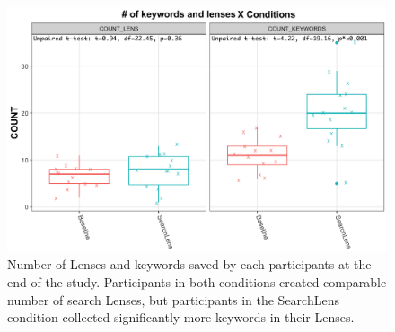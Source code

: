 





\begin{figure}
    \centering
    \includegraphics[height=0.45\columnwidth]{Chapters/SearchLens/figures/LensKeywordsCount3.png}
    \caption[Number of Lenses and keywords saved the participants.]{Number of Lenses and keywords saved by each participants at the end of the study. Participants in both conditions created comparable number of search Lenses, but participants in the SearchLens condition collected significantly more keywords in their Lenses.}
    \label{fig:sl_numberOfLenses}
\end{figure}

